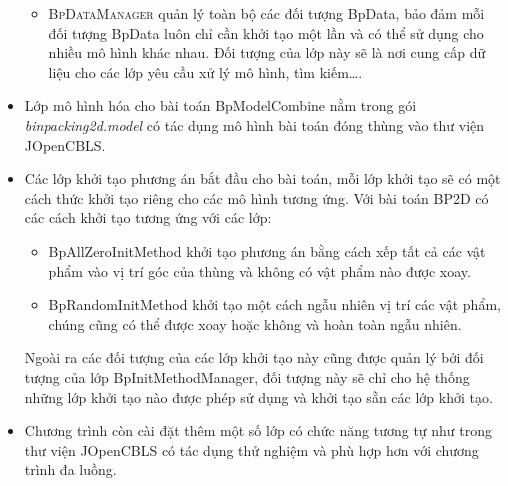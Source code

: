 \begin{itemize}
\begin{itemize}
\begin{lstlisting}
		\end{lstlisting}
		\item \textsc{BpDataManager} quản lý toàn bộ các đối tượng \textsf{BpData}, bảo đảm mỗi đối tượng \textsf{BpData} luôn chỉ cần khởi tạo một lần và có thể sử dụng cho nhiều mô hình khác nhau. Đối tượng của lớp này sẽ là nơi cung cấp dữ liệu cho các lớp yêu cầu xử lý mô hình, tìm kiếm\dots.
	\end{itemize}
	\item Lớp mô hình hóa cho bài toán \textsf{BpModelCombine} nằm trong gói \textit{binpacking2d.model} có tác dụng mô hình bài toán đóng thùng vào thư viện JOpenCBLS.
	\item Các lớp khởi tạo phương án bắt đầu cho bài toán, mỗi lớp khởi tạo sẽ có một cách thức khởi tạo riêng cho các mô hình tương ứng. Với bài toán BP2D có các cách khởi tạo tương ứng với các lớp:
	\begin{itemize}
		\item \textsf{BpAllZeroInitMethod} khởi tạo phương án bằng cách xếp tất cả các vật phẩm vào vị trí góc của thùng và không có vật phẩm nào được xoay.
		\item \textsf{BpRandomInitMethod} khởi tạo một cách ngẫu nhiên vị trí các vật phẩm, chúng cũng có thể được xoay hoặc không và hoàn toàn ngẫu nhiên.
	\end{itemize}
	Ngoài ra các đối tượng của các lớp khởi tạo này cũng được quản lý bởi đối tượng của lớp \textsf{BpInitMethodManager}, đối tượng này sẽ chỉ cho hệ thống những lớp khởi tạo nào được phép sử dụng và khởi tạo sẵn các lớp khởi tạo.
	\item Chương trình còn cài đặt thêm một số lớp có chức năng tương tự như trong thư viện JOpenCBLS có tác dụng thử nghiệm và phù hợp hơn với chương trình đa luồng.
\end{itemize}

